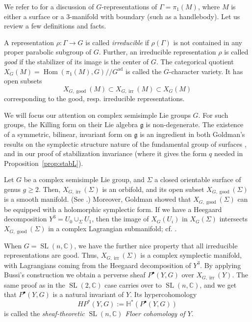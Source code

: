 \documentclass [11pt]{amsart}
\theoremstyle{remark}
\def\cc {{\mathbb{C}}}
\def\sslash {/ \! /}
\def\g{\mathfrak{g}}
\def\Gad{G^{\operatorname{ad}}}
\def\HP{\mathit{HP}}
\def\HH{\mathbb{H}}
\def\sl {{\operatorname{SL}(2, \cc)}}
\def\sln {{\operatorname{SL}(n, \cc)}}
\def\Char {X}
\def\Hom {\operatorname{Hom}}
\def\irr{\operatorname{irr}}
\begin{document}
We refer to \cite{Sikora} for a discussion of $G$-representations of $\Gamma = \pi_1(M)$, where $M$ is either a surface or a $3$-manifold with boundary (such as a handlebody). Let us review a few  definitions and facts.

A representation $\rho: \Gamma \to G$ is called {\em irreducible} if $\rho(\Gamma)$ is not contained in any proper parabolic subgroup of $G$. Further, an irreducible representation $\rho$ is called {\em good} if the stabilizer of its image is the center of $G$. The categorical quotient $\Char_G(M) = \Hom(\pi_1(M), G)  \sslash \Gad$ is called the $G$-character variety. It has open subsets
$$  \Char_{G, \operatorname{good}}(M) \subset \Char_{G, \irr}(M) \subset \Char_G(M)$$
corresponding to the good, resp. irreducible representations. 

We will focus our attention on complex semisimple Lie groups $G$. For such groups, the Killing form on their Lie algebra $\g$ is non-degenerate. The existence of a symmetric, bilinear, invariant form on $\g$ is an ingredient in both Goldman's results on the symplectic structure nature of the fundamental group of surfaces \cite{Goldman}, and in our proof of stabilization invariance (where it gives the form $q$ needed in Proposition~\ref{prop:stabL}). 

Let $G$ be a complex semisimple Lie group, and $\Sigma$ a closed orientable surface of genus $g \geq 2$. Then, $\Char_{G, \irr}(\Sigma)$ is an orbifold, and its open subset $\Char_{G, \operatorname{good}}(\Sigma)$ is a smooth manifold. (See \cite[Proposition 5]{Sikora}.) Moreover, Goldman \cite{Goldman} showed that $\Char_{G, \operatorname{good}}(\Sigma)$ can be equipped with a holomorphic symplectic form. If we have a Heegaard decomposition $Y^3 = U_0 \cup_{\Sigma} U_1$, then the image of $\Char_G(U_i)$ in $\Char_G(\Sigma)$ intersects $\Char_{G, \operatorname{good}}(\Sigma)$ in a complex Lagrangian submanifold; cf. \cite[Theorem 6]{Sikora}. 

When $G = \sln$, we have the further nice property that all irreducible representations are good. Thus, $\Char_{G, \irr}(\Sigma)$ is a complex symplectic manifold, with Lagrangians coming from the Heegaard decomposition of $Y^3$. By applying Bussi's construction we obtain a perverse sheaf $P^{\bullet}(Y, G)$ over $\Char_{G, \irr}(Y)$. The same proof as in the $\sl$ case carries over to $\sln$, and we get that $P^{\bullet}(Y, G)$ is a natural invariant of $Y$. Its hypercohomology
$$  \HP^*(Y, G) := \HH^*( P^{\bullet}(Y, G))$$
is called the {\em sheaf-theoretic $\sln$ Floer cohomology of $Y$}. 
\end{document}
